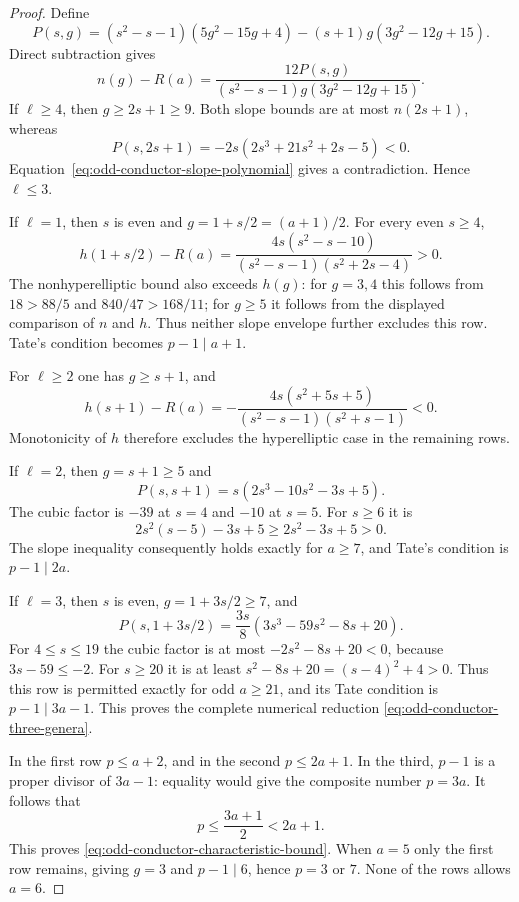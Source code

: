 \begin{proof}
Define
\[
 P(s,g)=(s^2-s-1)(5g^2-15g+4)
       -(s+1)g(3g^2-12g+15).
\]
Direct subtraction gives
\begin{equation}\label{eq:odd-conductor-slope-polynomial}
 n(g)-R(a)=
 \frac{12P(s,g)}{(s^2-s-1)g(3g^2-12g+15)}.
\end{equation}
If $\ell\geq4$, then $g\geq2s+1\geq9$.
Both slope bounds are at most $n(2s+1)$, whereas
\[
 P(s,2s+1)=-2s(2s^3+21s^2+2s-5)<0.
\]
Equation~\eqref{eq:odd-conductor-slope-polynomial} gives a
contradiction. Hence $\ell\leq3$.

If $\ell=1$, then $s$ is even and $g=1+s/2=(a+1)/2$.
For every even $s\geq4$,
\[
 h(1+s/2)-R(a)=
 \frac{4s(s^2-s-10)}{(s^2-s-1)(s^2+2s-4)}>0.
\]
The nonhyperelliptic bound also exceeds $h(g)$: for $g=3,4$
this follows from $18>88/5$ and $840/47>168/11$;
for $g\geq5$ it follows from the displayed comparison of
$n$ and $h$. Thus neither slope envelope further excludes
this row. Tate's condition becomes $p-1\mid a+1$.

For $\ell\geq2$ one has $g\geq s+1$, and
\[
 h(s+1)-R(a)=
 -\frac{4s(s^2+5s+5)}{(s^2-s-1)(s^2+s-1)}<0.
\]
Monotonicity of $h$ therefore excludes the hyperelliptic case
in the remaining rows.

If $\ell=2$, then $g=s+1\geq5$ and
\[
 P(s,s+1)=s(2s^3-10s^2-3s+5).
\]
The cubic factor is $-39$ at $s=4$ and $-10$ at $s=5$.
For $s\geq6$ it is
\[
 2s^2(s-5)-3s+5\geq2s^2-3s+5>0.
\]
The slope inequality consequently holds exactly for $a\geq7$,
and Tate's condition is $p-1\mid2a$.

If $\ell=3$, then $s$ is even, $g=1+3s/2\geq7$, and
\[
 P(s,1+3s/2)=\frac{3s}{8}(3s^3-59s^2-8s+20).
\]
For $4\leq s\leq19$ the cubic factor is at most
$-2s^2-8s+20<0$, because $3s-59\leq-2$.
For $s\geq20$ it is at least
$s^2-8s+20=(s-4)^2+4>0$.
Thus this row is permitted exactly for odd $a\geq21$,
and its Tate condition is $p-1\mid3a-1$.
This proves the complete numerical reduction
\eqref{eq:odd-conductor-three-genera}.

In the first row $p\leq a+2$, and in the second
$p\leq2a+1$. In the third, $p-1$ is a proper divisor
of $3a-1$: equality would give the composite number $p=3a$.
It follows that
\[
 p\leq\frac{3a+1}{2}<2a+1.
\]
This proves \eqref{eq:odd-conductor-characteristic-bound}.
When $a=5$ only the first row remains, giving $g=3$ and
$p-1\mid6$, hence $p=3$ or $7$. None of the rows allows $a=6$.
\end{proof}

